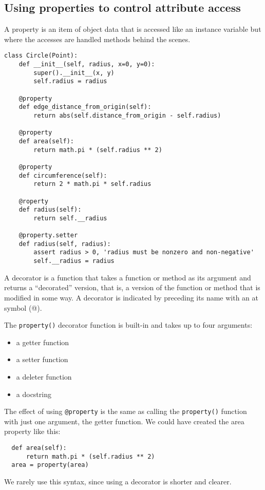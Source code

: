 \subsection{Using properties to control attribute access}

\begin{tcolorbox}
A property is an item of object data that is accessed like an instance variable
but where the accesses are handled methods behind the scenes.
\end{tcolorbox}


\begin{lstlisting}
class Circle(Point):
    def __init__(self, radius, x=0, y=0):
        super().__init__(x, y)
        self.radius = radius

    @property
    def edge_distance_from_origin(self):
        return abs(self.distance_from_origin - self.radius)

    @property
    def area(self):
        return math.pi * (self.radius ** 2)

    @property
    def circumference(self):
        return 2 * math.pi * self.radius

    @roperty
    def radius(self):
        return self.__radius

    @property.setter
    def radius(self, radius):
        assert radius > 0, 'radius must be nonzero and non-negative'
        self.__radius = radius  
\end{lstlisting}

\begin{tcolorbox}
  A decorator is a function that takes a function or method as its argument and returns a ``decorated'' version,
  that is, a version of the function or method that is modified in some way.
  A decorator is indicated by preceding its name with an at symbol (@). 
\end{tcolorbox}



The \verb|property()| decorator function is built-in and takes up to four arguments:
\begin{itemize}
\item a getter function
\item a setter function 
\item a deleter function
\item a docstring
\end{itemize}

The effect of using \verb|@property| is the same as calling the \verb|property()| function with just one argument, the getter function.
We could have created the area property like this:
\begin{lstlisting}
  def area(self):
      return math.pi * (self.radius ** 2)
  area = property(area)
\end{lstlisting}
We rarely use this syntax, since using a decorator is shorter and clearer.





